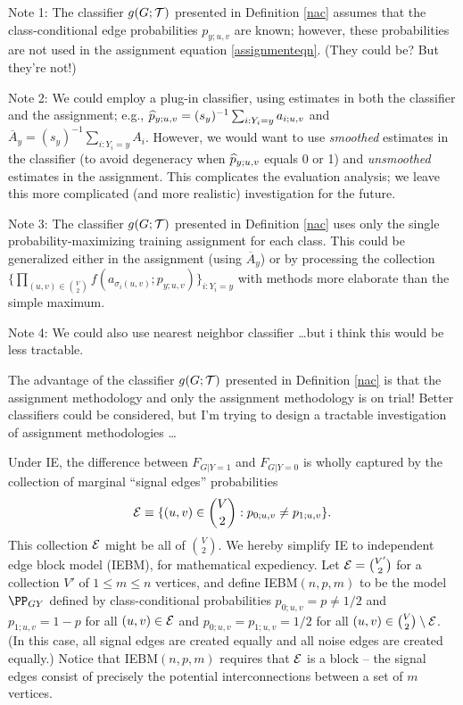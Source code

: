 Note 1:
The classifier $g(G;\mathcal{T})$ presented in Definition \ref{nac}
assumes that the class-conditional edge probabilities $p_{y;u,v}$ are known;
however, these probabilities are not used in the assignment equation \ref{assignmenteqn}.
(They could be? But they're not!)

Note 2:
We could employ a plug-in classifier,
using estimates in both the classifier and the assignment;
e.g., $\widehat{p}_{y;u,v} = (s_y)^{-1} \sum_{i:Y_i=y} a_{i;u,v}$
and $\overline{A}_y = (s_y)^{-1} \sum_{i:Y_i=y} A_{i}$.
However, we would want to use {\em smoothed} estimates in the classifier
(to avoid degeneracy when $\widehat{p}_{y;u,v}$ equals 0 or 1)
and {\em unsmoothed} estimates in the assignment.
This complicates the evaluation analysis;
we leave this more complicated (and more realistic) investigation for the future.

Note 3:
The classifier $g(G;\mathcal{T})$ presented in Definition \ref{nac}
uses only the single probability-maximizing training assignment for each class.
This could be generalized either in the assignment (using $\overline{A}_y$)
or by processing the collection
$\{\prod_{(u,v) \in {V \choose 2}} f(a_{\sigma_i(u,v)};p_{y;u,v})\}_{i:Y_i=y}$
with methods more elaborate than the simple maximum.

Note 4:
We could also use nearest neighbor classifier \dots but i think this would be less tractable.

The advantage of the classifier $g(G;\mathcal{T})$ presented in Definition \ref{nac}
is that the assignment methodology and only the assignment methodology is on trial!
Better classifiers could be considered,
but I'm trying to design a tractable investigation of assignment methodologies \dots


Under IE,
the difference between
$F_{G|Y=1}$ and $F_{G|Y=0}$
is wholly captured by the collection of marginal ``signal edges'' probabilities
$$\mathcal{E} \equiv \{(u,v) \in {V \choose 2}: p_{0;u,v} \neq p_{1;u,v}\}.$$
This collection $\mathcal{E}$ might be all of ${V \choose 2}$.
We hereby simplify IE to independent edge block model (IEBM), for mathematical expediency.
Let $\mathcal{E} = {V' \choose 2}$ for a collection $V'$ of $1 \leq m \leq n$ vertices,
and define
IEBM$(n,p,m)$ to be the model $\PP_{GY}$ defined by class-conditional probabilities
$p_{0;u,v}=p \neq 1/2$ and $p_{1;u,v}=1-p$ for all $(u,v) \in \mathcal{E}$
and $p_{0;u,v}=p_{1;u,v}=1/2$ for all $(u,v) \in {V \choose 2} \setminus \mathcal{E}$.
(In this case, all signal edges are created equally and all noise edges are created equally.)
Notice that
IEBM$(n,p,m)$ requires that $\mathcal{E}$ is a block --
the signal edges consist of precisely the potential interconnections between a set of $m$ vertices.


